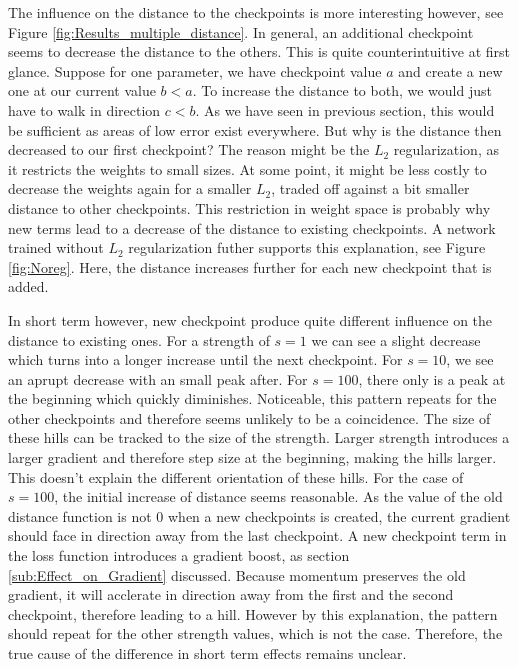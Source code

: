 The influence on the distance to the checkpoints is more interesting however,
see Figure \ref{fig:Results_multiple_distance}. In general, an additional
checkpoint seems to decrease the distance to the others. This is quite
counterintuitive at first glance. Suppose for one parameter, we have checkpoint
value $a$ and create a new one at our current value $b<a$. To increase the
distance to both, we would just have to walk in direction $c<b$. As we have seen
in previous section, this would be sufficient as areas of low error exist
everywhere. But why is the distance then decreased to our first checkpoint? The
reason might be the $L_2$ regularization, as it restricts the weights to small
sizes. At some point, it might be less costly to decrease the weights again for
a smaller $L_2$, traded off against a bit smaller distance to other checkpoints.
This restriction in weight space is probably why new terms lead to a decrease of
the distance to existing checkpoints. A network trained without $L_2$
regularization futher supports this explanation, see Figure \ref{fig:Noreg}.
Here, the distance increases further for each new checkpoint that is added.






In short term however, new checkpoint produce quite different influence on the
distance to existing ones. For a strength of $s=1$ we can see a slight decrease
which turns into a longer increase until the next checkpoint. For $s=10$, we see
an aprupt decrease with an small peak after. For $s=100$, there only is a peak
at the beginning which quickly diminishes. Noticeable, this pattern repeats for
the other checkpoints and therefore seems unlikely to be a coincidence. The size
of these hills can be tracked to the size of the strength. Larger strength
introduces a larger gradient and therefore step size at the beginning, making
the hills larger. This doesn't explain the different orientation of these hills.
For the case of $s=100$, the initial increase of distance seems reasonable. As
the value of the old distance function is not 0 when a new checkpoints is
created, the current gradient should face in direction away from the last
checkpoint. A new checkpoint term in the loss function introduces a gradient
boost, as section \ref{sub:Effect_on_Gradient} discussed. Because momentum
preserves the old gradient, it will acclerate in direction away from the first
and the second checkpoint, therefore leading to a hill. However by this
explanation, the pattern should repeat for the other strength values, which is
not the case. Therefore, the true cause of the difference in short term effects
remains unclear.
\clearpage


